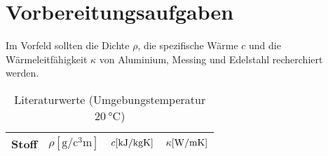 %
\section{Vorbereitungsaufgaben}
\label{sec:Vorbereitungsaufgaben}
Im Vorfeld sollten die Dichte $\rho$, die spezifische Wärme $c$ und die Wärmeleitfähigkeit $\kappa$ von Aluminium, Messing
und Edelstahl recherchiert werden. 
\begin{table}
    \centering
    \caption{Literaturwerte (Umgebungstemperatur $\SI{20}{\celsius}$)}
    \label{tab:Literaturwerte}
    \begin{tabular}{S | S[table-format=1.3] S[table-format=1.3] S[table-format=3.3]}
        \toprule
        {Stoff} & {$\rho [\si{\gram\per\cubic\centi\meter}] $} & {$c [\si{\kilo\joule\per{\kilo\gram\kelvin}}]$} 
        & {$\kappa [\si{\watt\per{\meter\kelvin}}]$} \\
        \midrule
        \bottomrule
    \end{tabular}
\end{table}